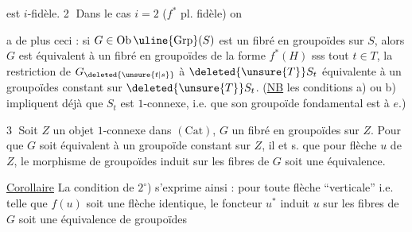 est $i$-fidèle. \textcircled{2} Dans le cas $i=2$ ($f^*$ pl. fidèle) on

a de plus ceci : si $G\in\mathrm{Ob}\,\uline{\mathrm{Grp}}(S)$ est un fibré en groupoïdes sur $S$, alors $G$ est équivalent à un fibré en groupoïdes de la forme $f^*(H)$ sss   tout $t\in T$, la restriction  de $G_{\deleted{\unsure{t|s}}}$ à $\deleted{\unsure{T}}S_t$  équivalente à un  groupoïdes constant sur $\deleted{\unsure{T}}S_t$. (\uline{NB} les conditions a) ou b) impliquent déjà que $S_t$ est $1$-connexe, i.e. que son groupoïde fondamental est  à $e$.)

\textcircled{3} Soit $Z$ un objet $1$-connexe dans $(\mathrm{Cat})$,  $G$ un fibré en groupoïdes sur $Z$. Pour que $G$ soit équivalent à un groupoïde constant sur $Z$, il  et s. que pour  flèche $u$ de $Z$,  le  morphisme de groupoïdes  induit sur les fibres de $G$ soit une équivalence.



\uline{Corollaire} La condition  de $2^{\circ}$) s'exprime ainsi : pour toute flèche  ``verticale''   i.e. telle que $f(u)$ soit une flèche identique, le foncteur $u^*$ induit  $u$ sur les fibres de $G$ soit une équivalence de groupoïdes

